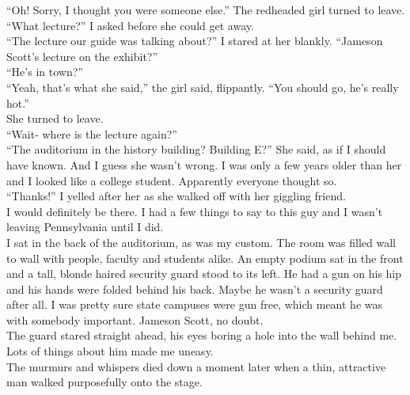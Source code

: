 \documentclass[a5paper]{scrartcl}
\begin{document}
\enquote{Oh! Sorry, I thought you were someone else.} The redheaded girl turned to leave.\\


\enquote{What lecture?} I asked before she could get away.\\


\enquote{The lecture our guide was talking about?} I stared at her blankly. \enquote{Jameson Scott's lecture on the exhibit?}\\


\enquote{He's in town?}\\


\enquote{Yeah, that's what she said,} the girl said, flippantly. \enquote{You should go, he's really hot.}\\


She turned to leave.\\


\enquote{Wait- where is the lecture again?}\\


\enquote{The auditorium in the history building? Building E?} She said, as if I should have known. And I guess she wasn't wrong. I was only a few years older than her and I looked like a college student. Apparently everyone thought so.\\


\enquote{Thanks!} I yelled after her as she walked off with her giggling friend.\\


I would definitely be there. I had a few things to say to this guy and I wasn't leaving Pennsylvania until I did.\\


I sat in the back of the auditorium, as was my custom. The room was filled wall to wall with people, faculty and students alike. An empty podium sat in the front and a tall, blonde haired security guard stood to its left. He had a gun on his hip and his hands were folded behind his back. Maybe he wasn't a security guard after all. I was pretty sure state campuses were gun free, which meant he was with somebody important. Jameson Scott, no doubt.\\


The guard stared straight ahead, his eyes boring a hole into the wall behind me. Lots of things about him made me uneasy.\\


The murmurs and whispers died down a moment later when a thin, attractive man walked purposefully onto the stage.\\
\end{document}

